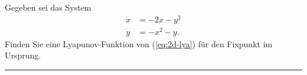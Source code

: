 \documentclass[11pt,a4paper]{article}
\begin{document}
\bigskip%

\begin{aufg}
Gegeben sei das System
\begin{equation}\label{eq:2d-lya}
\begin{aligned}
 \dot{x} &= -2x - y^2\\
 \dot{y} &= -x^2 - y.
\end{aligned} 
\end{equation}
Finden Sie eine Lyapunov-Funktion von (\ref{eq:2d-lya}) f\"ur den Fixpunkt
im Ursprung.
\end{aufg}






\bigskip
\hrule

\end{document}
